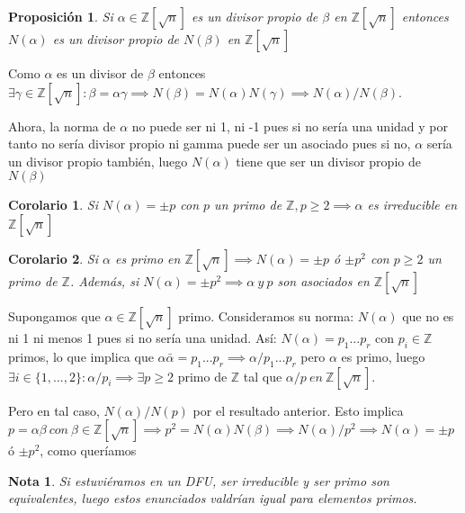 \documentclass[11pt, a4paper, titlepage]{article}
\makeatletter
\renewenvironment{proof}[1][\proofname] {\vspace{-15pt}\par\pushQED{\qed}\normalfont\topsep6\p@\@plus6\p@\relax\trivlist\item[\hskip\labelsep\it#1\@addpunct{.}]\ignorespaces}{\popQED\endtrivlist\@endpefalse}
\providecommand{\ent}{\mathbb{Z}}
\theoremstyle{theorem-style}
\newtheorem*{nprop}{Proposición}
\newtheorem{ncor}{Corolario}
\theoremstyle{definition-style}
\theoremstyle{remark-style}
\newtheorem*{nota}{Nota}
\theoremstyle{example-style}
\makeatother
\begin{document}
\begin{nprop}
	Si $\alpha \in \ent[\sqrt n]$ es un divisor propio de $\beta$ en $\ent[\sqrt n]$ entonces $N(\alpha)$ es un divisor propio de $N(\beta)$ en $\ent[\sqrt n]$
\end{nprop}
\begin{proof}
	Como $\alpha$ es un divisor de $\beta$ entonces $\exists \gamma \in \ent[\sqrt n] : \beta = \alpha \gamma \implies N(\beta) = N(\alpha)N(\gamma) \implies N(\alpha)/N(\beta)$.
	
	Ahora, la norma de $\alpha$ no puede ser ni 1, ni -1 pues si no sería una unidad y por tanto no sería divisor propio ni gamma puede ser un asociado pues si no, $\alpha$ sería un divisor propio también, luego $N(\alpha)$ tiene que ser un divisor propio de $N(\beta)$

\end{proof}
\begin{ncor}
	Si $N(\alpha) = \pm p$ con $p $ un primo de $\ent, p\geq 2\implies \alpha$ es irreducible en $\ent[\sqrt n]$ 
\end{ncor}
\begin{ncor}
	Si $\alpha$ es primo en $\ent[\sqrt n]\implies N(\alpha) = \pm p $ ó $\pm p^2$ con $p \geq 2 $ un primo de $\ent$. Además, si $N(\alpha) = \pm p^2 \implies \alpha \ y \ p$ son asociados en $\ent[\sqrt n]$
\end{ncor}
\begin{proof}
	Supongamos que $\alpha \in \ent[\sqrt n]$ primo. Consideramos su norma: $N(\alpha)$ que no es ni 1 ni menos 1 pues si no sería una unidad. Así: $N(\alpha) = p_1...p_r$ con $p_i\in \ent$ primos, lo que implica que $\alpha \bar{\alpha} = p_1...p_r \implies \alpha/p_1...p_r $ pero $\alpha$ es primo, luego $\exists i \in \{1,...,2\}: \alpha / p_i \implies \exists p \geq 2 $ primo de $\ent$ tal que $\alpha / p \ en \ \ent[\sqrt n]$.
	
	Pero en tal caso, $N(\alpha)/N(p)$ por el resultado anterior. Esto implica $p = \alpha \beta \ con \ \beta \in \ent[\sqrt n] \implies p^2 = N(\alpha) N(\beta) \implies N(\alpha)/p^2 \implies N(\alpha) = \pm p$ ó $\pm p^2$, como queríamos
\end{proof}
\begin{nota}
	Si estuviéramos en un DFU, ser irreducible y ser primo son equivalentes, luego estos enunciados valdrían igual para elementos primos.
\end{nota}
\end{document}
